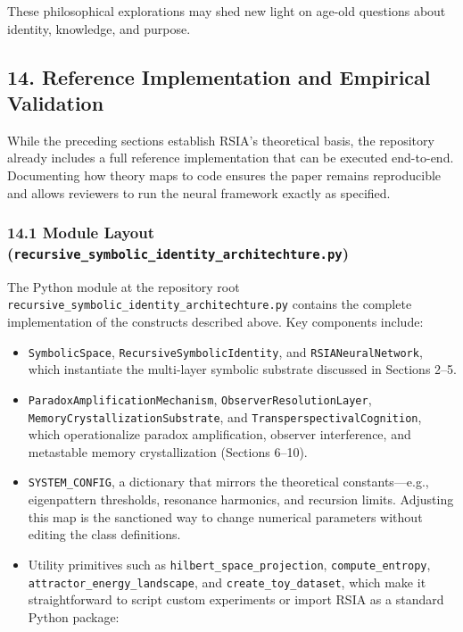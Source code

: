 \documentclass[12pt]{article}
\providecommand{\tightlist}{%
  \setlength{\itemsep}{0pt}\setlength{\parskip}{0pt}}
\begin{document}
These philosophical explorations may shed new light on age-old questions
about identity, knowledge, and purpose.

\subsection{14. Reference Implementation and Empirical
Validation}\label{reference-implementation-and-empirical-validation}

While the preceding sections establish RSIA's theoretical basis, the
repository already includes a full reference implementation that can be
executed end-to-end. Documenting how theory maps to code ensures the
paper remains reproducible and allows reviewers to run the neural
framework exactly as specified.

\subsubsection{\texorpdfstring{14.1 Module Layout
(\texttt{recursive\_symbolic\_identity\_architechture.py})}{14.1 Module Layout (recursive\_symbolic\_identity\_architechture.py)}}\label{module-layout-recursive_symbolic_identity_architechture.py}

The Python module at the repository root
\texttt{recursive\_symbolic\_identity\_architechture.py} contains the
complete implementation of the constructs described above. Key
components include:

\begin{itemize}
\tightlist
\item
  \texttt{SymbolicSpace}, \texttt{RecursiveSymbolicIdentity}, and
  \texttt{RSIANeuralNetwork}, which instantiate the multi-layer symbolic
  substrate discussed in Sections 2--5.
\item
  \texttt{ParadoxAmplificationMechanism},
  \texttt{ObserverResolutionLayer},
  \texttt{MemoryCrystallizationSubstrate}, and
  \texttt{TransperspectivalCognition}, which operationalize paradox
  amplification, observer interference, and metastable memory
  crystallization (Sections 6--10).
\item
  \texttt{SYSTEM\_CONFIG}, a dictionary that mirrors the theoretical
  constants---e.g., eigenpattern thresholds, resonance harmonics, and
  recursion limits. Adjusting this map is the sanctioned way to change
  numerical parameters without editing the class definitions.
\item
  Utility primitives such as \texttt{hilbert\_space\_projection},
  \texttt{compute\_entropy}, \texttt{attractor\_energy\_landscape}, and
  \texttt{create\_toy\_dataset}, which make it straightforward to script
  custom experiments or import RSIA as a standard Python package:
\end{itemize}
\end{document}

